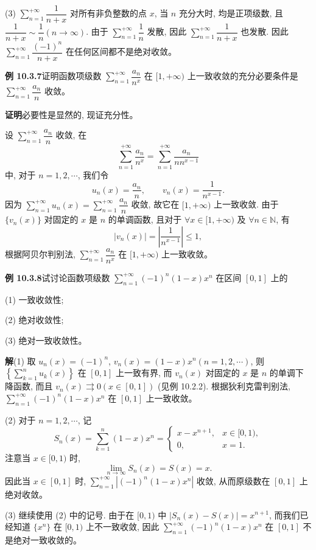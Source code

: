 \documentclass[UTF8, 12pt, fontset=fandol, oneside]{ctexart}
\begin{document}
(3) $\sum\limits_{n=1}^{+\infty}\dfrac1{n+x}$ 对所有非负整数的点 $x$, 当 $n$ 充分大时, 均是正项级数, 且 $\dfrac1{n+x}\sim\dfrac1n(n\to\infty)$. 由于 $\sum\limits_{n=1}^{+\infty}\dfrac1n$ 发散, 因此 $\sum\limits_{n=1}^{+\infty}\dfrac1{n+x}$ 也发散. 因此 $\sum\limits_{n=1}^{+\infty}\dfrac{(-1)^n}{n+x}$ 在任何区间都不是绝对收敛。

\noindent\textbf{例 10.3.7}\quad 证明函数项级数 $\sum\limits_{n=1}^{+\infty}\dfrac{a_n}{n^x}$ 在 $[1,+\infty)$ 上一致收敛的充分必要条件是 $\sum\limits_{n=1}^{+\infty}\dfrac{a_n}{n}$ 收敛。

\noindent\textbf{证明}\quad 必要性是显然的, 现证充分性。

设 $\sum\limits_{n=1}^{+\infty}\dfrac{a_n}{n}$ 收敛, 在
\[
  \sum_{n=1}^{+\infty}\frac{a_n}{n^x}
  =\sum_{n=1}^{+\infty}\frac{a_n}{nn^{x-1}}
\]
中, 对于 $n=1,2,\cdots$, 我们令
\[
  u_n(x)=\frac{a_n}{n},\qquad v_n(x)=\frac1{n^{x-1}}.
\]
因为 $\sum\limits_{n=1}^{+\infty}u_n(x)=\sum\limits_{n=1}^{+\infty}\dfrac{a_n}{n}$ 收敛, 故它在 $[1,+\infty)$ 上一致收敛. 由于 $\{v_n(x)\}$ 对固定的 $x$ 是 $n$ 的单调函数, 且对于 $\forall x\in[1,+\infty)$ 及 $\forall n\in\mathbb N$, 有
\[
  |v_n(x)|=\left|\frac1{n^{x-1}}\right|\leq1,
\]
根据阿贝尔判别法, $\sum\limits_{n=1}^{+\infty}\dfrac{a_n}{n^x}$ 在 $[1,+\infty)$ 上一致收敛。

\noindent\textbf{例 10.3.8}\quad 试讨论函数项级数 $\sum\limits_{n=1}^{+\infty}(-1)^n(1-x)x^n$ 在区间 $[0,1]$ 上的

(1) 一致收敛性;

(2) 绝对收敛性;

(3) 绝对一致收敛性。

\noindent\textbf{解}\quad (1) 取 $u_n(x)=(-1)^n$, $v_n(x)=(1-x)x^n(n=1,2,\cdots)$, 则 $\left\{\sum\limits_{k=1}^n u_k(x)\right\}$ 在 $[0,1]$ 上一致有界, 而 $v_n(x)$ 对固定的 $x$ 是 $n$ 的单调下降函数, 而且 $v_n(x)\rightrightarrows0(x\in[0,1])$ (见例 10.2.2). 根据狄利克雷判别法, $\sum\limits_{n=1}^{+\infty}(-1)^n(1-x)x^n$ 在 $[0,1]$ 上一致收敛。

(2) 对于 $n=1,2,\cdots$, 记
\[
  S_n(x)=\sum_{k=1}^n(1-x)x^n=
  \begin{cases}
    x-x^{n+1}, & x\in[0,1),\\
    0, & x=1.
  \end{cases}
\]
注意当 $x\in[0,1)$ 时,
\[
  \lim_{n\to\infty}S_n(x)=S(x)=x.
\]
因此当 $x\in[0,1]$ 时, $\sum\limits_{n=1}^{+\infty}|(-1)^n(1-x)x^n|$ 收敛, 从而原级数在 $[0,1]$ 上绝对收敛。

(3) 继续使用 (2) 中的记号. 由于在 $[0,1)$ 中 $|S_n(x)-S(x)|=x^{n+1}$, 而我们已经知道 $\{x^n\}$ 在 $[0,1)$ 上不一致收敛, 因此 $\sum\limits_{n=1}^{+\infty}(-1)^n(1-x)x^n$ 在 $[0,1]$ 不是绝对一致收敛的。
\end{document}
